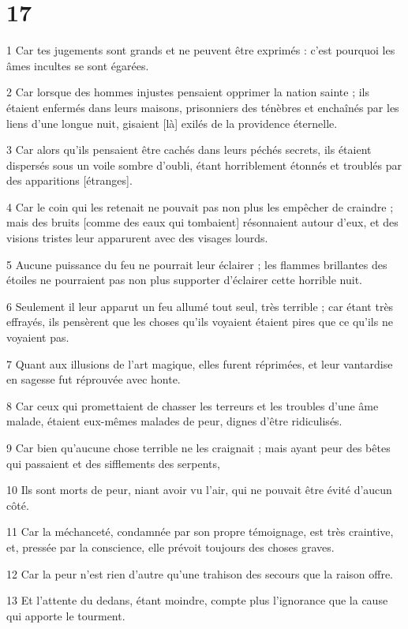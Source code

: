 \chapter{17}

\par 1 Car tes jugements sont grands et ne peuvent être exprimés : c'est pourquoi les âmes incultes se sont égarées.
\par 2 Car lorsque des hommes injustes pensaient opprimer la nation sainte ; ils étaient enfermés dans leurs maisons, prisonniers des ténèbres et enchaînés par les liens d'une longue nuit, gisaient [là] exilés de la providence éternelle.
\par 3 Car alors qu'ils pensaient être cachés dans leurs péchés secrets, ils étaient dispersés sous un voile sombre d'oubli, étant horriblement étonnés et troublés par des apparitions [étranges].
\par 4 Car le coin qui les retenait ne pouvait pas non plus les empêcher de craindre ; mais des bruits [comme des eaux qui tombaient] résonnaient autour d'eux, et des visions tristes leur apparurent avec des visages lourds.
\par 5 Aucune puissance du feu ne pourrait leur éclairer ; les flammes brillantes des étoiles ne pourraient pas non plus supporter d'éclairer cette horrible nuit.
\par 6 Seulement il leur apparut un feu allumé tout seul, très terrible ; car étant très effrayés, ils pensèrent que les choses qu'ils voyaient étaient pires que ce qu'ils ne voyaient pas.
\par 7 Quant aux illusions de l'art magique, elles furent réprimées, et leur vantardise en sagesse fut réprouvée avec honte.
\par 8 Car ceux qui promettaient de chasser les terreurs et les troubles d'une âme malade, étaient eux-mêmes malades de peur, dignes d'être ridiculisés.
\par 9 Car bien qu'aucune chose terrible ne les craignait ; mais ayant peur des bêtes qui passaient et des sifflements des serpents,
\par 10 Ils sont morts de peur, niant avoir vu l'air, qui ne pouvait être évité d'aucun côté.
\par 11 Car la méchanceté, condamnée par son propre témoignage, est très craintive, et, pressée par la conscience, elle prévoit toujours des choses graves.
\par 12 Car la peur n'est rien d'autre qu'une trahison des secours que la raison offre.
\par 13 Et l'attente du dedans, étant moindre, compte plus l'ignorance que la cause qui apporte le tourment.
